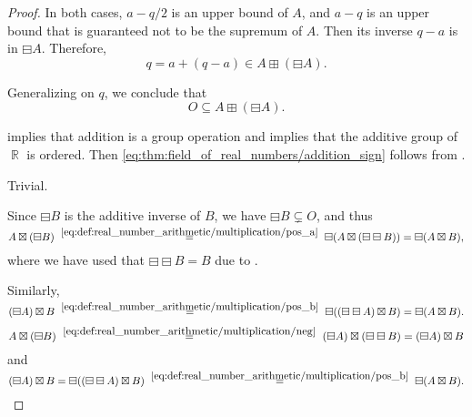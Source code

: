 \begin{proof}
  In both cases, \( a - q/2 \) is an upper bound of \( A \), and \( a - q \) is an upper bound that is guaranteed not to be the supremum of \( A \). Then its inverse \( q - a \) is in \( \boxminus A \). Therefore,
  \begin{equation*}
    q = a + (q - a) \in A \boxplus (\boxminus A).
  \end{equation*}

  Generalizing on \( q \), we conclude that
  \begin{equation*}
    O \subseteq A \boxplus (\boxminus A).
  \end{equation*}

    implies that addition is a group operation and  implies that the additive group of \( \BbbR \) is ordered. Then \eqref{eq:thm:field_of_real_numbers/addition_sign} follows from .


   Trivial.

   Since \( \boxminus B \) is the additive inverse of \( B \), we have \( \boxminus B \subsetneq O \), and thus
  \begin{equation*}
    A \boxtimes (\boxminus B)
    \reloset {\eqref{eq:def:real_number_arithmetic/multiplication/pos_a}} =
    \boxminus(A \boxtimes (\boxminus\boxminus B))
    =
    \boxminus(A \boxtimes B),
  \end{equation*}
  where we have used that \( \boxminus\boxminus B = B \) due to .

  Similarly,
  \begin{equation*}
    (\boxminus A) \boxtimes B
    \reloset {\eqref{eq:def:real_number_arithmetic/multiplication/pos_b}} =
    \boxminus((\boxminus\boxminus A) \boxtimes B)
    =
    \boxminus(A \boxtimes B).
  \end{equation*}

  \begin{equation*}
    A \boxtimes (\boxminus B)
    \reloset {\eqref{eq:def:real_number_arithmetic/multiplication/neg}} =
    (\boxminus A) \boxtimes (\boxminus\boxminus B)
    =
    (\boxminus A) \boxtimes B
  \end{equation*}
  and
  \begin{equation*}
    (\boxminus A) \boxtimes B
    =
    \boxminus ((\boxminus\boxminus A) \boxtimes B)
    \reloset {\eqref{eq:def:real_number_arithmetic/multiplication/pos_b}} =
    \boxminus(A \boxtimes B).
  \end{equation*}


\end{proof}
